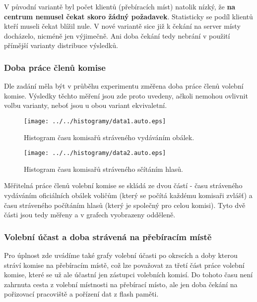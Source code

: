 \documentclass[12pt,a4paper,titlepage,final]{article}
\begin{document}
V původní variantě byl počet klientů (přebíracích míst) natolik nízký, že \textbf{na centrum nemusel čekat skoro žádný požadavek}. Statisticky se podíl klientů kteří museli čekat blížil nule. V nové variantě sice již k čekání na server místy docházelo, nicméně jen výjimečně. Ani doba čekání tedy nebrání v použití přímější varianty distribuce výsledků.

\subsubsection{Doba práce členů komise}

Dle zadání měla být v průběhu experimentu změřena doba práce členů volební komise. Výsledky těchto měření jsou zde proto uvedeny, ačkoli nemohou ovlivnit volbu varianty, neboť jsou u obou variant ekvivaletní.

\begin{figure}[H]
\centering
\begin{minipage}{.49\textwidth}
  \centering
  \texttt{[image: ../../histogramy/data1.auto.eps]}
  \caption{Histogram času komisařů stráveného vydáváním obálek.}
  \label{fig:data1}
\end{minipage}
\hfill
\begin{minipage}{.49\textwidth}
  \centering
  \texttt{[image: ../../histogramy/data2.auto.eps]}
  \caption{Histogram času komisařů stráveného sčítáním hlasů.}
  \label{fig:data2}
\end{minipage}
\end{figure}

Měřitelná práce členů volební komise se skládá ze dvou částí - času stráveného vydáváním oficiálních obálek voličům (který se počítá každému komisaři zvlášť) a času stráveného počítáním hlasů (který je společný pro celou komisi). Tyto dvě části jsou tedy měřeny a v grafech vyobrazeny odděleně.

\subsubsection{Volební účast a doba strávená na přebíracím místě}

Pro úplnost zde uvádíme také grafy volební účasti po okrscích a doby kterou stráví komise na přebíracím místě, což lze považovat za třetí část práce volební komise, které se už ale účastní jen zástupci volebních komisí. Do tohoto času není zahrnuta cesta z volební místnosti na přebírací místo, ale jen doba čekání na pořizovací pracoviště a pořízení dat z flash paměti.
\end{document}
